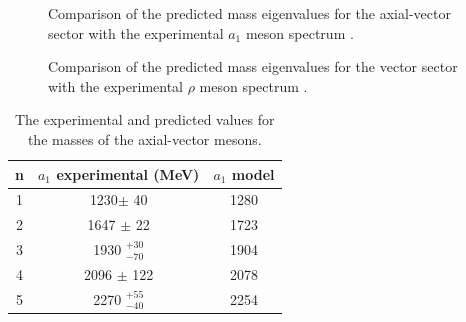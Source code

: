 \documentclass[aps,prd,12pt,nofootinbib]{revtex4}
\begin{document}
\begin{figure}[htb]
\caption{Comparison of the predicted mass eigenvalues for the axial-vector sector with the experimental $a_1$ meson spectrum \cite{PDG}.}
\end{figure}
\nopagebreak
\begin{figure}[htb]
\caption{Comparison of the predicted mass eigenvalues for the vector sector with the experimental $\rho$ meson spectrum \cite{PDG}.}
\label{figRho}
\end{figure}

\clearpage

\begin{table}[htb]
\center
\begin{tabular}{| c || c | c  |}
\hline
n & $a_1$ experimental (MeV) & $a_1$ model \\
\hline
1 & 1230$\pm$ 40 &	    	1280	 \\
2 & 1647 $\pm$ 22 & 	1723	 \\
3 & 1930  $^{+30}_{-70}$ & 1904\\
4 & 2096 $\pm$ 122 &      2078	 \\ 
5 & 2270 $^{+55}_{-40}$  & 2254\\
\hline
\end{tabular}
\caption{The experimental \cite{PDG} and predicted values for the masses of the axial-vector mesons.}
\label{tabAxial}
\end{table}
\end{document}
